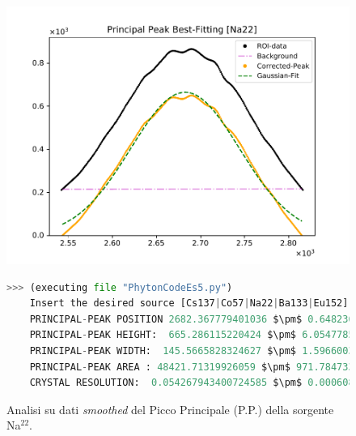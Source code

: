 \begin{figure}[h!]
	\centering
	\caption{Analisi su dati \emph{smoothed} del Picco Principale (P.P.) della sorgente Na$^{22}$. }
	\includegraphics[width =  \textwidth,trim={1cm 0 1cm 0}, clip]{Immagini/Peak-Fitting_Na22.pdf}
	\label{fig:PPNa22} \bigskip\bigskip
	\begin{lstlisting}[language=python, style=Pystyle, mathescape=true]
	>>> (executing file "PhytonCodeEs5.py")
	Insert the desired source [Cs137|Co57|Na22|Ba133|Eu152]: Na22
	PRINCIPAL-PEAK POSITION 2682.367779401036 $\pm$ 0.6482369680134931
	PRINCIPAL-PEAK HEIGHT:  665.286115220424 $\pm$ 6.054778595618799
	PRINCIPAL-PEAK WIDTH:  145.5665828324627 $\pm$ 1.596600338802527
	PRINCIPAL-PEAK AREA : 48421.71319926059 $\pm$ 971.7847334664561
	CRYSTAL RESOLUTION:  0.054267943400724585 $\pm$ 0.0006083352321870312
	\end{lstlisting}\bigskip\bigskip
\end{figure}

\newpage


